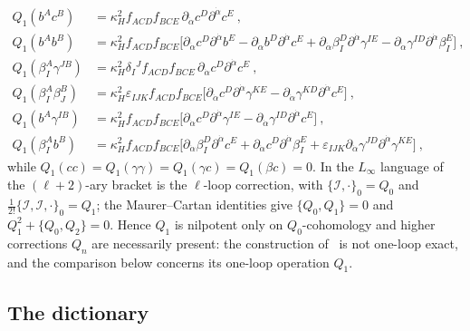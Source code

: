 \begin{equation}\label{eq:ht:componentpairs}
\begin{aligned}
Q_{1}(b^{A}c^{B})
&=\kappa_{H}^{2}f_{ACD}f_{BCE}\,
\partial_{\dot\alpha}c^{D}\partial^{\dot\alpha}c^{E} \ ,\\
Q_{1}(b^{A}b^{B})
&=\kappa_{H}^{2}f_{ACD}f_{BCE}
\big[\partial_{\dot\alpha}c^{D}\partial^{\dot\alpha}b^{E}
-\partial_{\dot\alpha}b^{D}\partial^{\dot\alpha}c^{E}
+\partial_{\dot\alpha}\beta_{I}^{D}\partial^{\dot\alpha}\gamma^{IE}
-\partial_{\dot\alpha}\gamma^{ID}\partial^{\dot\alpha}\beta_{I}^{E}\big] \ ,\\
Q_{1}(\beta_{I}^{A}\gamma^{JB})
&=\kappa_{H}^{2}\delta_{I}{}^{J}f_{ACD}f_{BCE}\,
\partial_{\dot\alpha}c^{D}\partial^{\dot\alpha}c^{E} \ ,\\
Q_{1}(\beta_{I}^{A}\beta_{J}^{B})
&=\kappa_{H}^{2}\varepsilon_{IJK}f_{ACD}f_{BCE}
\big[\partial_{\dot\alpha}c^{D}\partial^{\dot\alpha}\gamma^{KE}
-\partial_{\dot\alpha}\gamma^{KD}\partial^{\dot\alpha}c^{E}\big] \ ,\\
Q_{1}(b^{A}\gamma^{IB})
&=\kappa_{H}^{2}f_{ACD}f_{BCE}
\big[\partial_{\dot\alpha}c^{D}\partial^{\dot\alpha}\gamma^{IE}
-\partial_{\dot\alpha}\gamma^{ID}\partial^{\dot\alpha}c^{E}\big] \ ,\\
Q_{1}(\beta_{I}^{A}b^{B})
&=\kappa_{H}^{2}f_{ACD}f_{BCE}
\big[\partial_{\dot\alpha}\beta_{I}^{D}\partial^{\dot\alpha}c^{E}
+\partial_{\dot\alpha}c^{D}\partial^{\dot\alpha}\beta_{I}^{E}
+\varepsilon_{IJK}\partial_{\dot\alpha}\gamma^{JD}
\partial^{\dot\alpha}\gamma^{KE}\big] \ ,
\end{aligned}
\end{equation}
while $Q_{1}(cc)=Q_{1}(\gamma\gamma)=Q_{1}(\gamma c)=Q_{1}(\beta c)=0$.
In the $L_{\infty}$ language of~\cite{BK} the $(\ell+2)$-ary bracket is the
$\ell$-loop correction, with $\{\mathcal I,\cdot\}_{0}=Q_{0}$ and
$\frac{1}{2!}\{\mathcal I,\mathcal I,\cdot\}_{0}=Q_{1}$; the Maurer--Cartan
identities give $\{Q_{0},Q_{1}\}=0$ and $Q_{1}^{2}+\{Q_{0},Q_{2}\}=0$. Hence
$Q_{1}$ is nilpotent only on $Q_{0}$-cohomology and higher corrections
$Q_{n}$ are necessarily present: the construction of~\cite{BK} is not
one-loop exact, and the comparison below concerns its one-loop operation
$Q_{1}$.

\subsection{The dictionary}\label{subsec:ht:dictionary}

